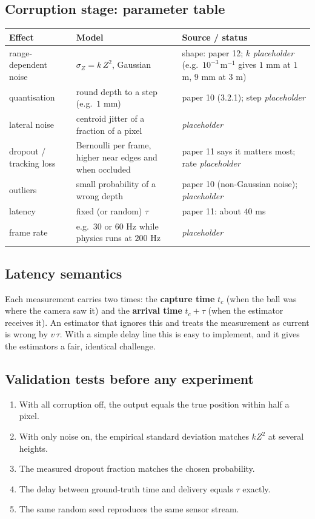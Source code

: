 \documentclass[11pt,a4paper]{article}
\begin{document}
\subsection{Corruption stage: parameter table}
\begin{center}
\renewcommand{\arraystretch}{1.25}
\begin{tabularx}{\textwidth}{@{}l X X@{}}
\toprule
Effect & Model & Source / status \\
\midrule
range-dependent noise & $\sigma_Z=k\,Z^{2}$, Gaussian & shape: paper 12; $k$ \emph{placeholder} (e.g.\ $10^{-3}$\,m$^{-1}$ gives $1$ mm at $1$ m, $9$ mm at $3$ m) \\
quantisation & round depth to a step (e.g.\ $1$ mm) & paper 10 (3.2.1); step \emph{placeholder} \\
lateral noise & centroid jitter of a fraction of a pixel & \emph{placeholder} \\
dropout / tracking loss & Bernoulli per frame, higher near edges and when occluded & paper 11 says it matters most; rate \emph{placeholder} \\
outliers & small probability of a wrong depth & paper 10 (non-Gaussian noise); \emph{placeholder} \\
latency & fixed (or random) $\tau$ & paper 11: about $40$ ms \\
frame rate & e.g.\ $30$ or $60$ Hz while physics runs at $200$ Hz & \emph{placeholder} \\
\bottomrule
\end{tabularx}
\end{center}

\subsection{Latency semantics}
Each measurement carries two times: the \textbf{capture time} $t_c$ (when the ball was where the
camera saw it) and the \textbf{arrival time} $t_c+\tau$ (when the estimator receives it). An
estimator that ignores this and treats the measurement as current is wrong by $v\,\tau$. With a
simple delay line this is easy to implement, and it gives the estimators a fair, identical
challenge.

\subsection{Validation tests before any experiment}
\begin{enumerate}
\item With all corruption off, the output equals the true position within half a pixel.
\item With only noise on, the empirical standard deviation matches $kZ^2$ at several heights.
\item The measured dropout fraction matches the chosen probability.
\item The delay between ground-truth time and delivery equals $\tau$ exactly.
\item The same random seed reproduces the same sensor stream.
\end{enumerate}
\end{document}
